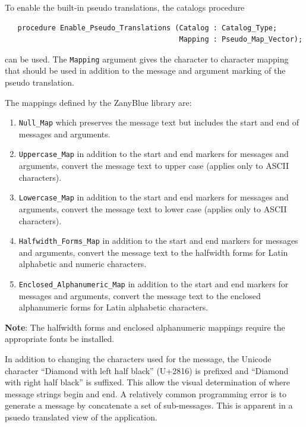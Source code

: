 To enable the built-in pseudo translations, the catalogs procedure
\begin{xmpl}
\begin{verbatim}
   procedure Enable_Pseudo_Translations (Catalog : Catalog_Type;
                                         Mapping : Pseudo_Map_Vector);
\end{verbatim}
\end{xmpl}
can be used.  The \verb|Mapping| argument gives the character to character
mapping that should be used in addition to the message and argument marking
of the pseudo translation.

The mappings defined by the ZanyBlue library are:
\begin{enumerate}
\item	\verb|Null_Map| which preserves the message text but includes
	the start and end of messages and arguments.
\item	\verb|Uppercase_Map| in addition to the start and end markers
	for messages and arguments, convert the message text to upper
	case (applies only to ASCII characters).
\item	\verb|Lowercase_Map| in addition to the start and end markers
	for messages and arguments, convert the message text to lower
	case (applies only to ASCII characters).
\item	\verb|Halfwidth_Forms_Map| in addition to the start and end markers
	for messages and arguments, convert the message text to the
	halfwidth forms for Latin alphabetic and numeric characters.
\item	\verb|Enclosed_Alphanumeric_Map| in addition to the start and end
	markers for messages and arguments, convert the message text to the
	enclosed alphanumeric forms for Latin alphabetic characters.
\end{enumerate}
\textbf{Note}: The halfwidth forms and enclosed alphanumeric mappings
require the appropriate fonts be installed.

In addition to changing the characters used for the message, the Unicode
character ``Diamond with left half black'' (U+2816) is prefixed and ``Diamond
with right half black'' is suffixed.  This allow the visual determination
of where message strings begin and end.  A relatively common programming
error is to generate a message by concatenate a set of sub-messages.  This
is apparent in a psuedo translated view of the application.

